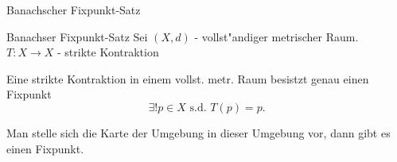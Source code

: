 \documentclass[class=article, crop=false]{standalone}
\begin{document}
\begin{zettel}{Banachscher Fixpunkt-Satz}
\begin{flashcard}[15wg8zu1]{Banachser Fixpunkt-Satz}
	Sei $ (X,d) $  - vollst"andiger metrischer Raum. $T: X \longrightarrow X$ - strikte Kontraktion

	\begin{theorem}
		Eine strikte Kontraktion in einem vollst. metr. Raum besistzt genau einen Fixpunkt
		\[
			\exists ! p \in  X \text{ s.d. } T(p)  = p
		.\]
	\end{theorem}
\end{flashcard}
\begin{example}[Fixpunkt]
	Man stelle sich die Karte der Umgebung in dieser Umgebung vor, dann gibt es einen Fixpunkt.
\end{example}
\end{zettel}
\end{document}
